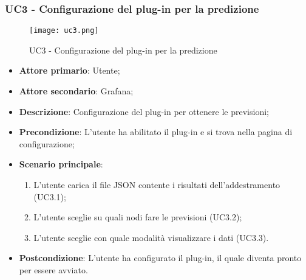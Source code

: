 \newpage
\subsubsection{UC3 - Configurazione del plug-in per la predizione}
\label{sssec:uc3}

\begin{figure}[h!]
  \begin{center}
    \texttt{[image: uc3.png]}\\
    \caption{UC3 - Configurazione del plug-in per la predizione}%
    \label{fig:uc3}
  \end{center}
  \end{figure}

  \begin{itemize}
    \item \textbf{Attore primario}: Utente;
    \item \textbf{Attore secondario}: Grafana;
    \item \textbf{Descrizione}: Configurazione del plug-in per ottenere le previsioni;
    \item \textbf{Precondizione}: L'utente ha abilitato il plug-in e si trova nella pagina di configurazione;
    \item \textbf{Scenario principale}:
    \begin{enumerate}
      \item L'utente carica il file JSON contente i risultati dell'addestramento (UC3.1);
      \item L'utente sceglie su quali nodi fare le previsioni (UC3.2);
      \item L'utente sceglie con quale modalità visualizzare i dati (UC3.3).
    \end{enumerate}
    \item \textbf{Postcondizione}: L'utente ha configurato il plug-in, il quale diventa pronto per essere avviato.
  \end{itemize}

